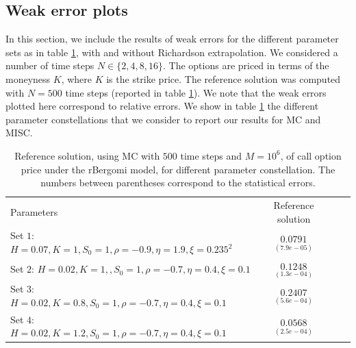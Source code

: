 \begin{enumerate}
	\end{enumerate}

	
	











\subsection{Weak error plots} \label{sec:Weak error plots_no_change}
In this section, we include the results of weak errors for the different parameter sets as in table \ref{table:Reference solution, using MC with $500$ time steps, of Call option price under rBergomi model, for different parameter constellation.}, with and without Richardson extrapolation.  We considered a number of time steps $N \in \{2,4,8,16\}$.  The options are priced in terms of the moneyness $K$, where $K$ is the strike price.  The reference solution was computed with $N=500$ time steps (reported in table \ref{table:Reference solution, using MC with $500$ time steps, of Call option price under rBergomi model, for different parameter constellation.}). We note that the weak errors plotted here correspond to relative errors. We show in table \ref{table:Reference solution, using MC with $500$ time steps, of Call option price under rBergomi model, for different parameter constellation.} the different parameter constellations that we consider to report our results for MC and MISC.



\begin{table}[!h]
	\centering
	\begin{small}
	\begin{tabular}{l*{2}{c}r}
		Parameters            & Reference solution    \\
			Set $1$:	$H=0.07, K=1,S_0=1, \rho=-0.9, \eta=1.9,\xi=0.235^2$   & $\underset{(7.9e-05)}{0.0791}$  \\	

				Set $2$:	$H=0.02, K=1,,S_0=1, \rho=-0.7, \eta=0.4,\xi=0.1$   & $\underset{(1.3e-04)}{0.1248}$  \\
					Set $3$:	$H=0.02, K=0.8,S_0=1, \rho=-0.7, \eta=0.4,\xi=0.1$   & $\underset{(5.6e-04)}{0.2407}$  \\
						Set $4$:	$H=0.02, K=1.2,S_0=1, \rho=-0.7, \eta=0.4,\xi=0.1$   & $\underset{(2.5e-04)}{0.0568}$  \\
		\hline
	\end{tabular}
\end{small}
	\caption{Reference solution, using MC with $500$ time steps and $M=10^6$, of call option price under the rBergomi model, for different parameter constellation.  The numbers between parentheses correspond to the statistical errors.}
	\label{table:Reference solution, using MC with $500$ time steps, of Call option price under rBergomi model, for different parameter constellation.}
\end{table}

